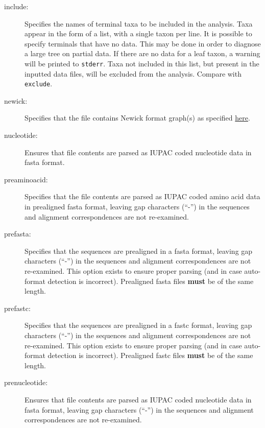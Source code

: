 \begin{description}
		\item [include:] Specifies the names of terminal taxa to be included in the analysis. 
		Taxa appear in the form of a list, with a single taxon per line. It is possible to specify 
		terminals that have no data. This may be done in order to diagnose a large tree on 
		partial data. If there are no data for a leaf taxon, a warning will be printed to \texttt{stderr}. 
		Taxa not included in this list, but present in the inputted data files, will be excluded from 
		the analysis. Compare with \texttt{exclude}.
			
		\item [newick:] Specifies that the file contains Newick format graph(s) as specified 
		\href{https://evolution.genetics.washington.edu/phylip/newick_doc.html}{here}.
			
		\item [nucleotide:] Ensures that file contents are parsed as IUPAC coded nucleotide data 
		in fasta \citep{PearsonandLipman1988} format.
			
		\item [preaminoacid:] Specifies that the file contents are parsed as IUPAC coded amino 
		acid data in  prealigned fasta \citep{PearsonandLipman1988} format, leaving 
		gap characters (``-'') in the sequences and alignment correspondences are not re-examined.
		
		\item [prefasta:] Specifies that the sequences are prealigned in a fasta format, leaving 
		gap characters (``-'') in the sequences and alignment correspondences are not re-examined. 
		This option exists to ensure proper parsing (and in case auto-format detection is incorrect).
		Prealigned fasta files \textbf{must} be of the same length.
			
		\item [prefastc:] Specifies that the sequences are prealigned in a fastc format, leaving gap 
		characters (``-'') in the sequences and alignment correspondences are not re-examined. 
		This option exists to ensure proper parsing (and in case auto-format detection is incorrect).
		Prealigned fastc files \textbf{must} be of the same length.			
		
		\item [prenucleotide:] Ensures that file contents are parsed as IUPAC coded nucleotide data 
		in fasta \citep{PearsonandLipman1988} format, leaving 
		gap characters (``-'') in the sequences and alignment correspondences are not re-examined.
		

\end{description}
